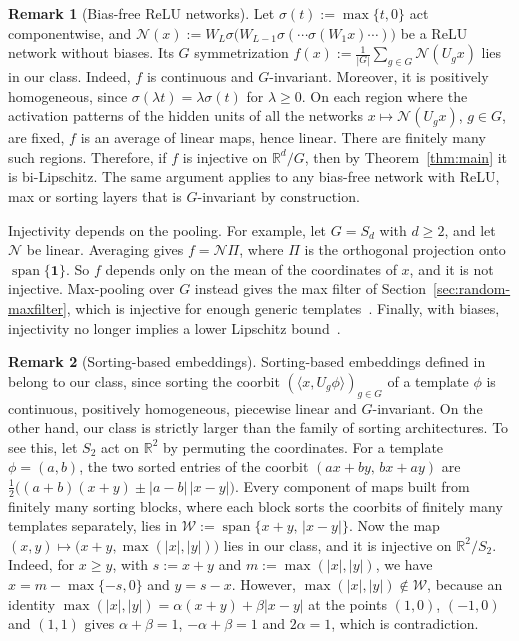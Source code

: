 \documentclass[11pt]{article}
\newcommand{\R}{\mathbb{R}}
\newcommand{\inner}[2]{\langle #1, #2 \rangle}
\theoremstyle{definition}
\newtheorem*{rem*}{Remark}
\begin{document}
\begin{rem*}[Bias-free ReLU networks]
	Let $\sigma(t):=\max\{t,0\}$ act componentwise, and
	$\mathcal N(x):=W_L\sigma\bigl(W_{L-1}\sigma(\cdots\sigma(W_1x)\cdots)\bigr)$ be a
	ReLU network without biases. Its $G$ symmetrization
	$f(x):=\frac1{|G|}\sum_{g\in G}\mathcal N(U_gx)$ lies in our class. Indeed, $f$ is continuous
	and $G$-invariant. Moreover, it is positively homogeneous, since $\sigma(\lambda t)=\lambda\sigma(t)$
	for $\lambda\ge0$. On each region where the activation patterns of the hidden units of all
	the networks $x\mapsto\mathcal N(U_gx)$, $g\in G$, are fixed, $f$ is an average of linear maps,
	hence linear. There are finitely many such regions. Therefore, if $f$ is injective on
	$\R^d/G$, then by Theorem~\ref{thm:main} it is bi-Lipschitz. The same argument applies to any
	bias-free network with ReLU, max or sorting layers that is $G$-invariant by construction.

	Injectivity depends on the pooling. For example, let $G=S_d$ with
$d\ge2$, and let $\mathcal N$ be linear. Averaging gives $f=\mathcal N\Pi$, where $\Pi$ is
the orthogonal projection onto $\operatorname{span}\{\mathbf 1\}$. So $f$ depends only on the
mean of the coordinates of $x$, and it is not injective. Max-pooling over $G$ instead gives the
max filter of Section~\ref{sec:random-maxfilter}, which is injective for enough generic
templates~\cite{cahill2025group}. Finally, with biases, injectivity no longer implies a lower
Lipschitz bound~\cite[Remark~6]{balan2024sorting}.
\end{rem*}

\begin{rem*}[Sorting-based embeddings]
	Sorting-based embeddings defined in~\cite{balan2024sorting} belong to our class, since sorting the
	coorbit $(\inner{x}{U_g\phi})_{g\in G}$ of a template $\phi$ is continuous, positively
	homogeneous, piecewise linear and $G$-invariant. On the other hand, our class is
	strictly larger than the family of sorting architectures. To see this, let $S_2$ act
	on $\R^2$ by permuting the coordinates. For a template $\phi=(a,b)$, the two sorted entries
	of the coorbit $(ax+by,\,bx+ay)$ are $\frac12\bigl((a+b)(x+y)\pm|a-b|\,|x-y|\bigr)$.
	Every component of maps built from finitely many sorting blocks, where each block sorts
	the coorbits of finitely many templates separately, lies in
	$\mathcal W:=\operatorname{span}\{x+y,\,|x-y|\}$. Now the map
	$(x,y)\mapsto\bigl(x+y,\max(|x|,|y|)\bigr)$ lies in our class, and it is injective on
	$\R^2/S_2$. Indeed, for $x\ge y$, with $s:=x+y$ and $m:=\max(|x|,|y|)$, we have
	$x=m-\max\{-s,0\}$ and $y=s-x$. However, $\max(|x|,|y|)\notin\mathcal W$, because an
	identity $\max(|x|,|y|)=\alpha(x+y)+\beta|x-y|$ at the points $(1,0)$, $(-1,0)$ and $(1,1)$
	gives $\alpha+\beta=1$, $-\alpha+\beta=1$ and $2\alpha=1$, which is contradiction.
\end{rem*}
\end{document}
